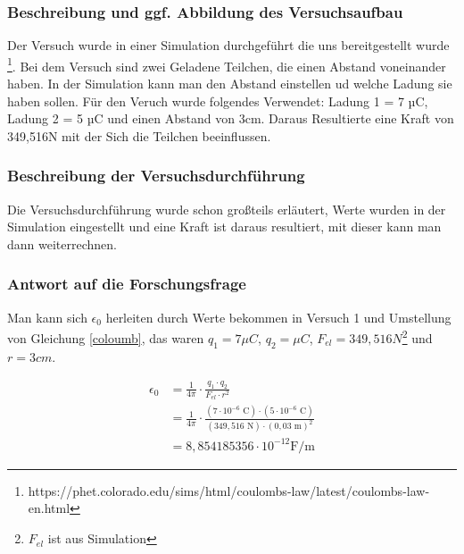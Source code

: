 \documentclass[a4paper]{report}
\begin{document}
\subsubsection{Beschreibung und ggf. Abbildung des Versuchsaufbau} %
\label{ssub:Beschreibung und ggf. Abbildung des Versuchsaufbau}
Der Versuch wurde in einer Simulation durchgeführt die uns bereitgestellt
wurde \footnote{https://phet.colorado.edu/sims/html/coulombs-law/latest/coulombs-law-en.html}.
Bei dem Versuch sind zwei Geladene Teilchen, die einen Abstand voneinander
haben. In der Simulation kann man den Abstand einstellen ud welche Ladung sie haben sollen.
Für den Veruch wurde folgendes Verwendet: Ladung 1 = 7 µC, Ladung 2 = 5 µC und einen Abstand von 3cm.
Daraus Resultierte eine Kraft von 349,516N mit der Sich die Teilchen beeinflussen.





\subsubsection{Beschreibung der Versuchsdurchführung} %
\label{ssub:Beschreibung der Versuchsdurchführung}
Die Versuchsdurchführung wurde schon großteils erläutert, Werte wurden in der
Simulation eingestellt und eine Kraft ist daraus resultiert, mit dieser kann
man dann weiterrechnen.


\subsubsection{Antwort auf die Forschungsfrage} %
\label{ssub:Messergebnisse und ggf. grafische Veranschaulichung}
Man kann sich $\epsilon_0$ herleiten durch Werte bekommen in Versuch 1 und
Umstellung von Gleichung \ref{coloumb}, das
waren $q_1=7\mu C$, $q_2=\mu C$, $F_{el}=349,516N$\footnote{$F_{el}$ ist aus Simulation} und $r=3cm$.

\begin{align}
\epsilon_0 &= \frac{1}{4\pi} \cdot \frac{q_1 \cdot q_2}{F_{el} \cdot r^2} \\
&= \frac{1}{4\pi} \cdot \frac{(7\cdot 10^{-6}\text{ C}) \cdot (5\cdot
10^{-6}\text{ C})}{(349,516\text{ N}) \cdot (0,03\text{ m})^2} \\
&= 8,854185356\cdot 10^{-12}\text{F/m} \label{eps-rech-2}
\end{align}
\end{document}
